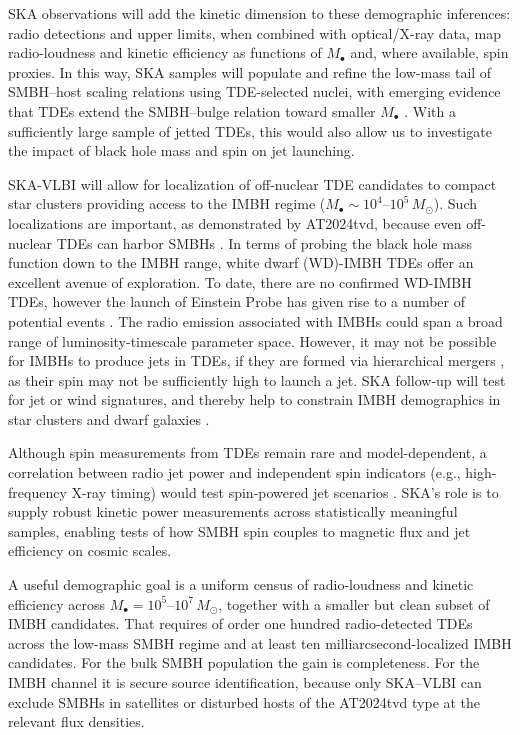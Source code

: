 \documentclass[a4paper,11pt]{article}
\begin{document}
SKA observations will add the kinetic dimension to these demographic inferences: radio detections and upper limits, when combined with optical/X-ray data, map radio-loudness and kinetic efficiency as functions of $M_\bullet$ and, where available, spin proxies. In this way, SKA samples will populate and refine the low-mass tail of SMBH--host scaling relations using TDE-selected nuclei, with emerging evidence that TDEs extend the SMBH--bulge relation toward smaller $M_\bullet$ \citep{vanVelzen2021,Wevers2017}. With a sufficiently large sample of jetted TDEs, this would also allow us to investigate the impact of black hole mass and spin on jet launching.


SKA-VLBI will allow for localization of off-nuclear TDE candidates to compact star clusters providing access to the IMBH regime ($M_\bullet\sim 10^{4}$--$10^{5}\,M_\odot$). Such localizations are important, as demonstrated by AT2024tvd, because even off-nuclear TDEs can harbor SMBHs \citep{2025ApJ...985L..48Y}. In terms of probing the black hole mass function down to the IMBH range, white dwarf (WD)-IMBH TDEs offer an excellent avenue of exploration. To date, there are no confirmed WD-IMBH TDEs, however the launch of Einstein Probe has given rise to a number of potential events \citep{OConnor2025, Li2025}. The radio emission associated with IMBHs could span a broad range of luminosity-timescale parameter space. However, it may not be possible for IMBHs to produce jets in TDEs, if they are formed via hierarchical mergers \citep{2002ApJ...576..894M}, as their spin may not be sufficiently high to launch a jet. 
SKA follow-up will test for jet or wind signatures, and thereby help to constrain IMBH demographics in star clusters and dwarf galaxies \citep{Lin2018,Mezcua2017,LiuYQ2025}. 





Although spin measurements from TDEs remain rare and model-dependent, a correlation between radio jet power and independent spin indicators (e.g., high-frequency X-ray timing) would test spin-powered jet scenarios \citep{Tchekhovskoy2014,BlandfordZnajek1977}. SKA's role is to supply robust kinetic power measurements across statistically meaningful samples, enabling tests of how SMBH spin couples to magnetic flux and jet efficiency on cosmic scales.

A useful demographic goal is a uniform census of radio-loudness and kinetic efficiency across $M_{\bullet}=10^{5}$--$10^{7}\,M_\odot$, together with a smaller but clean subset of IMBH candidates. That requires of order one hundred radio-detected TDEs across the low-mass SMBH regime and at least ten milliarcsecond-localized IMBH candidates. For the bulk SMBH population the gain is completeness. For the IMBH channel it is secure source identification, because only SKA--VLBI can exclude SMBHs in satellites or disturbed hosts of the AT2024tvd type at the relevant flux densities.
\end{document}
